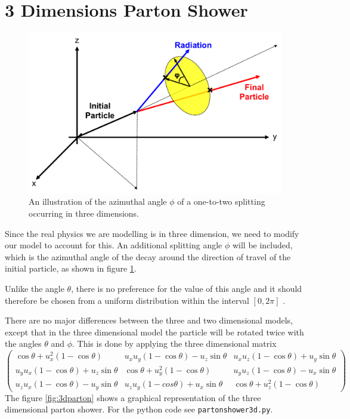 \section{3 Dimensions Parton Shower}

\begin{figure}[hbtp]
\centering
\includegraphics[scale=.27]{images/three-dimentions.png}
\caption{An illustration of the azimuthal angle $\phi$ of a one-to-two splitting occurring in three dimensions.}\label{fig:3d}
\end{figure}
Since the real physics we are modelling is in three dimension, we need to modify our model to account for this. An additional splitting angle $\phi$ will be included, which is the azimuthal angle of the decay  around the direction of travel of the initial particle, as shown in figure \ref{fig:3d}.

Unlike the angle $\theta$, there is no preference for the value of this angle and it should therefore be chosen from a uniform distribution within the interval $[0,2\pi]$ \citep{Salam:2010zt}.

There are no major differences between the three and two dimensional models, except that in the three dimensional model the particle will be rotated twice with the angles $\theta$ and $\phi$. This is done by applying the three dimensional matrix       
\begin{equation} 
\begin{pmatrix}
\cos\theta + u^2_x(1-\cos\theta) & u_x u_y (1-\cos\theta) - u_z \sin\theta& u_x u_z(1-\cos\theta)+ u_y \sin\theta\\

u_y u_x (1 - \cos\theta) + u_z \sin\theta & \cos\theta + u_y^2 (1 - \cos\theta) & u_y u_z (1 - \cos\theta) - u_x \sin\theta \\

u_z u_x (1 - \cos\theta) - u_y \sin\theta & u_z u_y (1 - cos\theta) + u_x \sin\theta & \cos\theta + u_z^2 (1 - \cos\theta)
\end{pmatrix}
\end{equation}
The figure \ref{fig:3dparton} shows a graphical representation of the three dimensional parton shower. For the python code see \verb+partonshower3d.py+.

